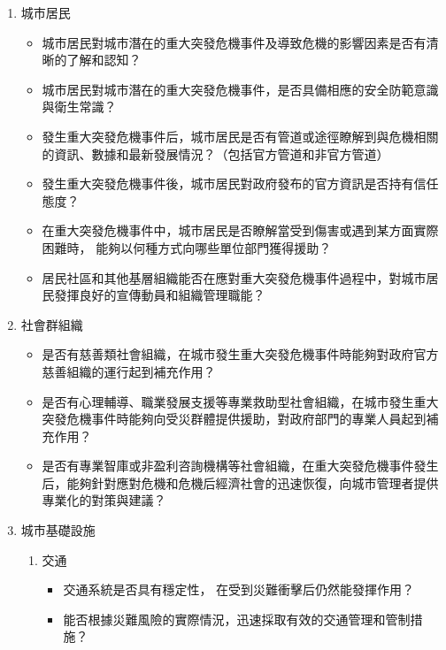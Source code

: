 \documentclass[a4paper,12pt]{article}
\begin{document}
\begin{enumerate}
\begin{enumerate}
\begin{itemize}
\end{itemize}
\item 城市居民
\label{sec:org435dec1}
\begin{itemize}
\item 城市居民對城市潛在的重大突發危機事件及導致危機的影響因素是否有清晰的了解和認知？\\
\item 城市居民對城市潛在的重大突發危機事件，是否具備相應的安全防範意識與衛生常識？\\
\item 發生重大突發危機事件后，城市居民是否有管道或途徑瞭解到與危機相關的資訊、數據和最新發展情況？（包括官方管道和非官方管道）\\
\item 發生重大突發危機事件後，城市居民對政府發布的官方資訊是否持有信任態度？\\
\item 在重大突發危機事件中，城市居民是否瞭解當受到傷害或遇到某方面實際困難時， 能夠以何種方式向哪些單位部門獲得援助？\\
\item 居民社區和其他基層組織能否在應對重大突發危機事件過程中，對城市居民發揮良好的宣傳動員和組織管理職能？\\
\end{itemize}
\item 社會群組織
\label{sec:orgb084255}
\begin{itemize}
\item 是否有慈善類社會組織，在城市發生重大突發危機事件時能夠對政府官方慈善組織的運行起到補充作用？\\
\item 是否有心理輔導、職業發展支援等專業救助型社會組織，在城市發生重大突發危機事件時能夠向受災群體提供援助，對政府部門的專業人員起到補充作用？\\
\item 是否有專業智庫或非盈利咨詢機構等社會組織，在重大突發危機事件發生后，能夠針對應對危機和危機后經濟社會的迅速恢復，向城市管理者提供專業化的對策與建議？\\
\end{itemize}
\item 城市基礎設施
\label{sec:orgc35e53b}
\begin{enumerate}
\item 交通
\label{sec:org79b6c78}
\begin{itemize}
\item 交通系統是否具有穩定性， 在受到災難衝擊后仍然能發揮作用？\\
\item 能否根據災難風險的實際情況，迅速採取有效的交通管理和管制措施？\\

\end{itemize}
\end{enumerate}
\end{enumerate}
\end{enumerate}
\end{document}
